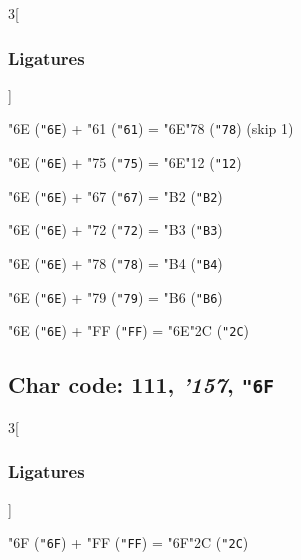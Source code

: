 \documentclass{article}
\newlength{\maxcharwidth}
\begin{document}
\begin{multicols}{3}[\subsubsection{Ligatures}]

{\testfont\char"6E\noboundary} ({\tt"6E}) + {\testfont\char"61\noboundary} ({\tt"61}) = {\testfont\char"6E\noboundary}{\testfont\char"78\noboundary} ({\tt"78})  (skip 1)

{\testfont\char"6E\noboundary} ({\tt"6E}) + {\testfont\char"75\noboundary} ({\tt"75}) = {\testfont\char"6E\noboundary}{\testfont\char"12\noboundary} ({\tt"12}) 

{\testfont\char"6E\noboundary} ({\tt"6E}) + {\testfont\char"67\noboundary} ({\tt"67}) = {\testfont\char"B2\noboundary} ({\tt"B2}) 

{\testfont\char"6E\noboundary} ({\tt"6E}) + {\testfont\char"72\noboundary} ({\tt"72}) = {\testfont\char"B3\noboundary} ({\tt"B3}) 

{\testfont\char"6E\noboundary} ({\tt"6E}) + {\testfont\char"78\noboundary} ({\tt"78}) = {\testfont\char"B4\noboundary} ({\tt"B4}) 

{\testfont\char"6E\noboundary} ({\tt"6E}) + {\testfont\char"79\noboundary} ({\tt"79}) = {\testfont\char"B6\noboundary} ({\tt"B6}) 

{\testfont\char"6E\noboundary} ({\tt"6E}) + {\testfont\char"FF\noboundary} ({\tt"FF}) = {\testfont\char"6E\noboundary}{\testfont\char"2C\noboundary} ({\tt"2C}) 

\end{multicols}

\subsection{Char code: 111, {\it'157}, {\tt"6F}}
\label{char_111}


\begin{multicols}{3}[\subsubsection{Ligatures}]

{\testfont\char"6F\noboundary} ({\tt"6F}) + {\testfont\char"FF\noboundary} ({\tt"FF}) = {\testfont\char"6F\noboundary}{\testfont\char"2C\noboundary} ({\tt"2C}) 

\end{multicols}
\end{document}
